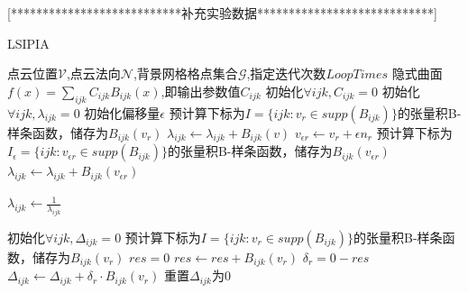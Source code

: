 [***************************补充实验数据****************************]
\begin{algorithm}
    \caption{LSIPIA}
    \label{alg:LSIPIA}
    \begin{algorithmic}[1]
    \Require 点云位置$\mathcal{V}$,点云法向$\mathcal{N}$,背景网格格点集合$\mathcal{G}$,指定迭代次数$LoopTimes$
    \Ensure 隐式曲面$f(x) = \sum_{ijk} C_{ijk}B_{ijk}(x)$,即输出参数值$C_{ijk}$
    \State 初始化$\forall ijk,C_{ijk} = 0$
    \State 初始化$\forall ijk,\lambda_{ijk} = 0$
    \State 初始化偏移量$\epsilon$
        \State 预计算下标为$I = \{ijk : v_r \in supp(B_{ijk})\}$的张量积B-样条函数，储存为$B_{ijk}(v_r)$
            \State $\lambda_{ijk} \leftarrow \lambda_{ijk} + B_{ijk}(v)$
        \EndFor
        \State $v_{\epsilon r} \leftarrow v_r + \epsilon n_r$
        \State 预计算下标为$I_{\epsilon} = \{ijk : v_{\epsilon r} \in supp(B_{ijk})\}$的张量积B-样条函数，储存为$B_{ijk}(v_{\epsilon r})$
            \State $\lambda_{ijk} \leftarrow \lambda_{ijk} + B_{ijk}(v_{\epsilon r})$
        \EndFor
    \EndFor
    
            \State $\lambda_{ijk}\leftarrow \frac{1}{\lambda_{ijk}}$
        \EndIf
    \EndFor

    \State 初始化$\forall ijk,\Delta_{ijk} = 0$
            \State 预计算下标为$I = \{ijk : v_r \in supp(B_{ijk})\}$的张量积B-样条函数，储存为$B_{ijk}(v_r)$
            \State $res = 0$
                \State $res \leftarrow res + B_{ijk}(v_r)$ 
            \EndFor
            \State $\delta_r = 0 - res$
                \State $\Delta_{ijk}\leftarrow \Delta_{ijk} + \delta_r \cdot B_{ijk}(v_r)$ 
                \State 重置$\Delta_{ijk}$为0
            \EndFor
        \EndFor
    \EndFor

    \end{algorithmic}
\end{algorithm}

